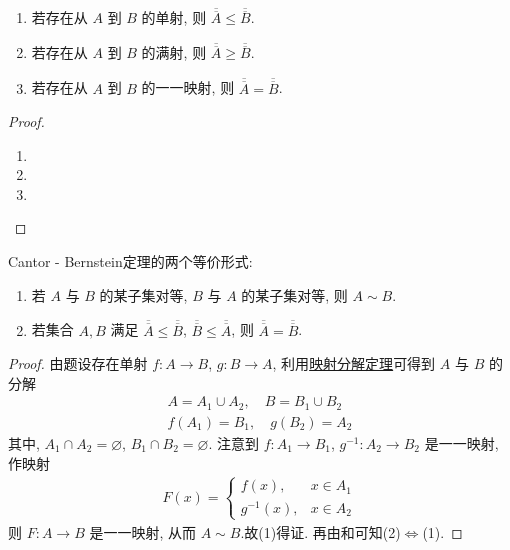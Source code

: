 \documentclass[../../main.tex]{subfiles}%
\begin{document}
\begin{proposition}[映射与基数之间的关系]\label{proposition:映射与基数之间的关系}
\begin{enumerate}[(1)]
\item 若存在从 $A$ 到 $B$ 的单射, 则 $\overline{\overline{A}} \leqslant \overline{\overline{B}}$.

\item\label{proposition:映射与基数之间的关系-2} 若存在从 $A$ 到 $B$ 的满射, 则 $\overline{\overline{A}} \geqslant \overline{\overline{B}}$.

\item 若存在从 $A$ 到 $B$ 的一一映射, 则 $\overline{\overline{A}} = \overline{\overline{B}}$.
\end{enumerate}
\end{proposition}
\begin{proof}
\begin{enumerate}[(1)]
\item 

\item 

\item 
\end{enumerate}

\end{proof}

\begin{theorem}\label{theorem:Cantor-Bernstein定理}
Cantor - Bernstein定理的两个等价形式:
\begin{enumerate}[(1)]
\item 若 $A$ 与 $B$ 的某子集对等, $B$ 与 $A$ 的某子集对等, 则 $A \sim B$.

\item 若集合 $A, B$ 满足 $\overline{\overline{A}} \leqslant \overline{\overline{B}}$, $\overline{\overline{B}} \leqslant \overline{\overline{A}}$, 则 $\overline{\overline{A}} = \overline{\overline{B}}$. 
\end{enumerate}
\end{theorem}
\begin{proof}

由题设存在单射 $f : A \to B$, $g : B \to A$, 利用\hyperref[lemma:映射定义域与陪域的无交分解]{映射分解定理}可得到 $A$ 与 $B$ 的分解
\begin{align*}
A = A_1 \cup A_2, \quad B = B_1 \cup B_2\\
f(A_1) = B_1, \quad g(B_2) = A_2
\end{align*}
其中, $A_1 \cap A_2 = \varnothing$, $B_1 \cap B_2 = \varnothing$. 注意到 $f : A_1 \to B_1$, $g^{-1} : A_2 \to B_2$ 是一一映射, 作映射
\begin{align*}
F(x) = 
\begin{cases}
f(x), & x \in A_1\\
g^{-1}(x), & x \in A_2
\end{cases}
\end{align*}
则 $F : A \to B$ 是一一映射, 从而 $A \sim B$.故(1)得证.
再由和可知(2)$\Leftrightarrow$(1).

\end{proof}
\end{document}
